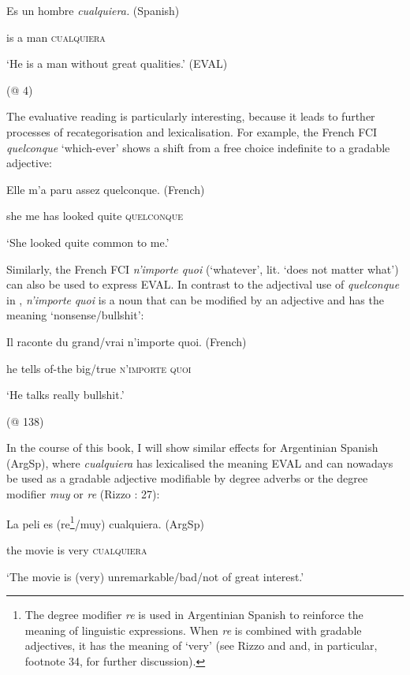 \documentclass[output=paper]{langscibook}
\begin{document}
    Es  un  hombre  \textit{cualquiera.}    (Spanish)

    is  a  man  \textsc{cualquiera}    

    ‘He is a man without great qualities.’ (EVAL)

    (@ 4)

The evaluative reading is particularly interesting, because it leads to further processes of recategorisation and lexicalisation. For example, the French FCI \textit{quelconque} ‘which-ever’ shows a shift from a free choice indefinite to a gradable adjective:

    Elle  m’a  paru  assez  quelconque.  (French)

    she  me has  looked  quite  \textsc{quelconque}   

    ‘She looked quite common to me.’   

    \citep[1530]{Vlachou2012}

Similarly, the French FCI \textit{n’importe quoi} (‘whatever’, lit. ‘does not matter what’) can also be used to express EVAL. In contrast to the adjectival use of \textit{quelconque} in , \textit{n’importe} \textit{quoi} is a noun that can be modified by an adjective and has the meaning ‘nonsense/bullshit’:

    Il  raconte  du  grand/vrai  n’importe quoi.  (French)

    he  tells  of-the  big/true  \textsc{n’importe} \textsc{quoi}   

    ‘He talks really bullshit.’  

    (@ 138)

In the course of this book, I will show similar effects for Argentinian Spanish (ArgSp), where \textit{cualquiera} has lexicalised the meaning EVAL and can nowadays be used as a gradable adjective modifiable by degree adverbs or the degree modifier \textit{muy} or \textit{re} (Rizzo \citealt{Salierno2013}: 27):

    La  peli  es  (re\footnote{ \textrm{The degree modifier} \textrm{\textit{re}} \textrm{is used in Argentinian Spanish to reinforce the meaning of linguistic expressions. When} \textrm{\textit{re}} \textrm{is combined with gradable adjectives, it has the meaning of ‘very’ (see Rizzo \citealt{Salierno2013} and  and, in particular, footnote 34, for further discussion).}}/muy)  cualquiera.  (ArgSp)

    the  movie  is  very  \textsc{cualquiera}   

    ‘The movie is (very) unremarkable/bad/not of great interest.’
\end{document}
